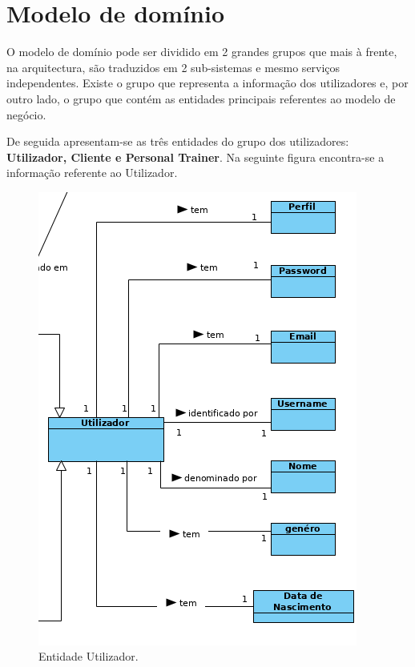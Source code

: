 \chapter{Modelo de domínio}
\label{chap:modelodominio}

\hspace{5mm} O modelo de domínio pode ser dividido em 2 grandes grupos que mais à frente, na arquitectura, são traduzidos em 2 sub-sistemas e mesmo serviços independentes. Existe o grupo que representa a informação dos utilizadores e, por outro lado, o grupo que contém as entidades principais referentes ao modelo de negócio.

\hspace{5mm} De seguida apresentam-se as três entidades do grupo dos utilizadores: \textbf{Utilizador, Cliente e Personal Trainer}. Na seguinte figura encontra-se a informação referente ao Utilizador.

\begin{figure}[H]
    \centering
    \includegraphics[scale=0.50]{images/modelação/utilizadores.png}
    \caption{Entidade Utilizador.}
    \label{fig:interfaceperfilptbycliente}
\end{figure}

